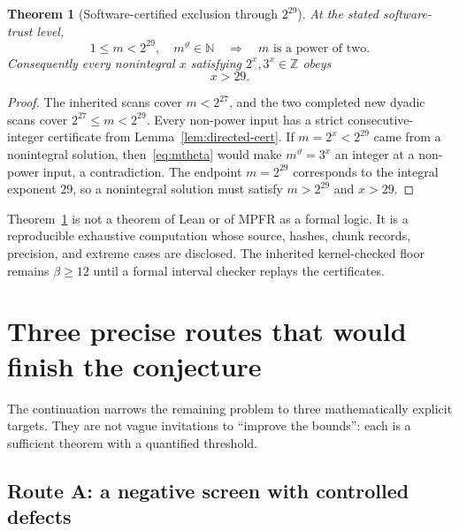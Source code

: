\documentclass[11pt]{article}
\newcommand{\N}{\mathbb N}
\newcommand{\Z}{\mathbb Z}
\newcommand{\1}{\mathbf 1}
\theoremstyle{plain}
\newtheorem{theorem}{Theorem}[section]
\theoremstyle{definition}
\theoremstyle{remark}
\begin{document}
\begin{theorem}[Software-certified exclusion through $2^{29}$]
\label{thm:finite29}
At the stated software-trust level,
\begin{equation}\label{eq:finite29-statement}
 1\le m<2^{29},\quad m^\vartheta\in\N
 \quad\Longrightarrow\quad
 m\text{ is a power of two}.
\end{equation}
Consequently every nonintegral $x$ satisfying $2^x,3^x\in\Z$ obeys
\begin{equation}\label{eq:x-gt-29}
 \boxed{x>29.}
\end{equation}
\end{theorem}

\begin{proof}
The inherited scans cover $m<2^{27}$, and the two completed new dyadic scans
cover $2^{27}\le m<2^{29}$.  Every non-power input has a strict consecutive-
integer certificate from Lemma~\ref{lem:directed-cert}.  If $m=2^x<2^{29}$
came from a nonintegral solution, then~\eqref{eq:mtheta} would make
$m^\vartheta=3^x$ an integer at a non-power input, a contradiction.  The
endpoint $m=2^{29}$ corresponds to the integral exponent $29$, so a
nonintegral solution must satisfy $m>2^{29}$ and $x>29$.
\end{proof}

\begin{warningbox}
Theorem~\ref{thm:finite29} is not a theorem of Lean or of MPFR as a formal
logic.  It is a reproducible exhaustive computation whose source, hashes,
chunk records, precision, and extreme cases are disclosed.  The inherited
kernel-checked floor remains $\beta\ge12$ until a formal interval checker
replays the certificates.
\end{warningbox}

\section{Three precise routes that would finish the conjecture}
\label{sec:proof-program}

The continuation narrows the remaining problem to three mathematically
explicit targets.  They are not vague invitations to ``improve the bounds'':
each is a sufficient theorem with a quantified threshold.

\subsection{Route A: a negative screen with controlled defects}
\end{document}
